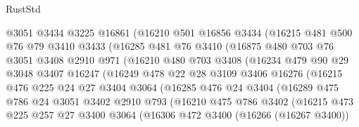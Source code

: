 \begin{lexlean}{RustStd}
\begin{coremodule}
              @3051
              @3434
              @3225
              @16861
              (@16210
                @501
                @16856
                @3434
                (@16215
                  @481
                  @500
                  @76
                  @79
                  @3410
                  @3433
                  (@16285
                    @481
                    @76
                    @3410
                    (@16875
                      @480
                      @703
                      @76
                      @3051
                      @3408
                      @2910
                      @971
                      (@16210
                        @480
                        @703
                        @3408
                        (@16234
                          @479
                          @90
                          @29
                          @3048
                          @3407
                          @16247
                          (@16249
                            @478
                            @22
                            @28
                            @3109
                            @3406
                            @16276
                            (@16215
                              @476
                              @225
                              @24
                              @27
                              @3404
                              @3064
                              (@16285
                                @476
                                @24
                                @3404
                                (@16289
                                  @475
                                  @786
                                  @24
                                  @3051
                                  @3402
                                  @2910
                                  @793
                                  (@16210
                                    @475
                                    @786
                                    @3402
                                    (@16215
                                      @473
                                      @225
                                      @257
                                      @27
                                      @3400
                                      @3064
                                      (@16306
                                        @472
                                        @3400
                                        (@16266 (@16267 @3400))

\end{coremodule}
\end{lexlean}
